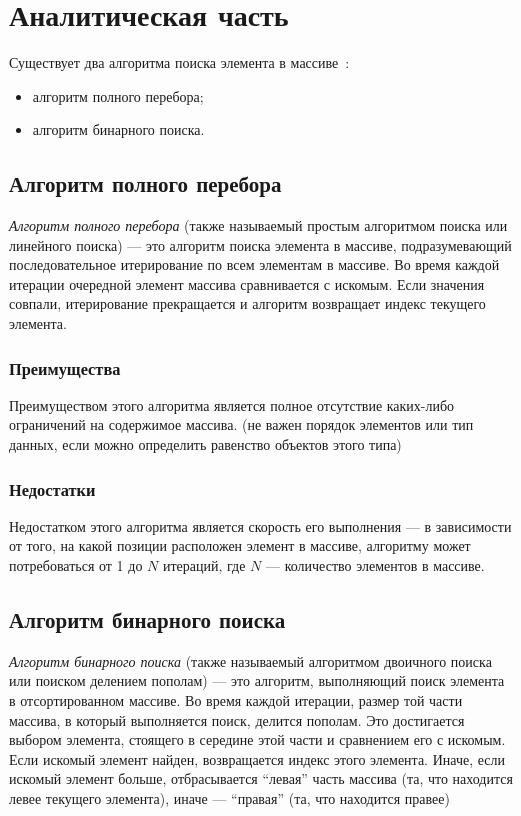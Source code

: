 \chapter{Аналитическая часть}

Существует два алгоритма поиска элемента в массиве~\cite{search-citation}:
\begin{itemize}
    \item алгоритм полного перебора;
    \item алгоритм бинарного поиска.
\end{itemize}

\section{Алгоритм полного перебора}

\emph{Алгоритм полного перебора} (также называемый простым алгоритмом поиска или линейного поиска) --- это алгоритм поиска элемента в массиве, подразумевающий последовательное итерирование по всем элементам в массиве. Во время каждой итерации очередной элемент массива сравнивается с искомым. Если значения совпали, итерирование прекращается и алгоритм возвращает индекс текущего элемента.

\subsection{Преимущества}

Преимуществом этого алгоритма является полное отсутствие каких-либо ограничений на содержимое массива. (не важен порядок элементов или тип данных, если можно определить равенство объектов этого типа)

\subsection{Недостатки}

Недостатком этого алгоритма является скорость его выполнения --- в зависимости от того, на какой позиции расположен элемент в массиве, алгоритму может потребоваться от 1 до $N$ итераций, где $N$ --- количество элементов в массиве.

\section{Алгоритм бинарного поиска}

\emph{Алгоритм бинарного поиска} (также называемый алгоритмом двоичного поиска или поиском делением пополам) --- это алгоритм, выполняющий поиск элемента в отсортированном массиве. Во время каждой итерации, размер той части массива, в который выполняется поиск, делится пополам. Это достигается выбором элемента, стоящего в середине этой части и сравнением его с искомым. Если искомый элемент найден, возвращается индекс этого элемента. Иначе, если искомый элемент больше, отбрасывается ``левая'' часть массива (та, что находится левее текущего элемента), иначе --- ``правая'' (та, что находится правее)

